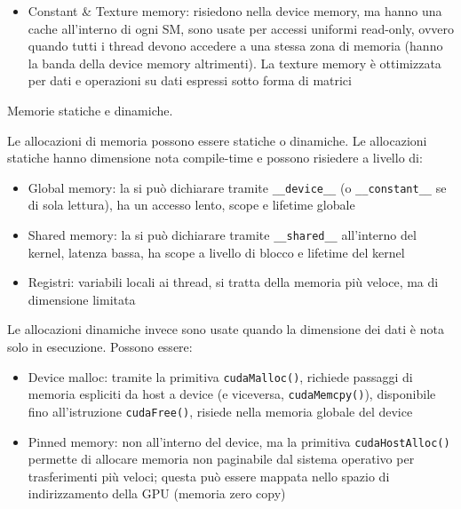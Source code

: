 \begin{questions}
\begin{solution}
\begin{itemize}
            \item Constant \& Texture memory: risiedono nella device memory, ma hanno una cache all'interno di ogni SM, sono usate per accessi uniformi read-only, ovvero quando tutti i thread devono accedere a una stessa zona di memoria (hanno la banda della device memory altrimenti). La texture memory è ottimizzata per dati e operazioni su dati espressi sotto forma di matrici
        \end{itemize}
    \end{solution}
    
    \question Memorie statiche e dinamiche.
    
    \begin{solution}
        Le allocazioni di memoria possono essere statiche o dinamiche. Le allocazioni statiche hanno dimensione nota compile-time e possono risiedere a livello di: 
        \begin{itemize}
            \item Global memory: la si può dichiarare tramite \texttt{\_\_device\_\_} (o \texttt{\_\_constant\_\_} se di sola lettura), ha un accesso lento, scope e lifetime globale
            
            \item Shared memory: la si può dichiarare tramite \texttt{\_\_shared\_\_} all'interno del kernel, latenza bassa, ha scope a livello di blocco e lifetime del kernel
            
            \item Registri: variabili locali ai thread, si tratta della memoria più veloce, ma di dimensione limitata
        \end{itemize}
        
        Le allocazioni dinamiche invece sono usate quando la dimensione dei dati è nota solo in esecuzione. Possono essere:
        \begin{itemize}
            \item Device malloc: tramite la primitiva \texttt{cudaMalloc()}, richiede passaggi di memoria espliciti da host a device (e viceversa, \texttt{cudaMemcpy()}), disponibile fino all'istruzione \texttt{cudaFree()}, risiede nella memoria globale del device
            
            \item Pinned memory: non all'interno del device, ma la primitiva \texttt{cudaHostAlloc()} permette di allocare memoria non paginabile dal sistema operativo per trasferimenti più veloci; questa può essere mappata nello spazio di indirizzamento della GPU (memoria zero copy)
            

\end{itemize}
\end{solution}
\end{questions}

